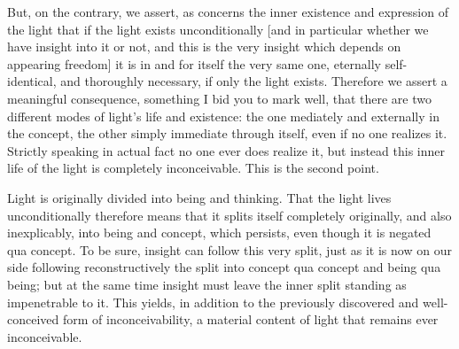 But, on the contrary, we assert,
as concerns the inner existence and
expression of the light
that if the light exists unconditionally
[and in particular whether we have insight into it or not,
and this is the very insight which depends on appearing freedom]
it is in and for itself the very same one,
eternally self-identical, and thoroughly necessary,
if only the light exists.
Therefore we assert a meaningful consequence,
something I bid you to mark well,
that there are two different modes
of light's life and existence:
the one mediately and externally in the concept,
the other simply immediate through itself,
even if no one realizes it.
Strictly speaking in actual fact
no one ever does realize it,
but instead this inner life of the light is
completely inconceivable.
This is the second point.

Light is originally divided into being and thinking.
That the light lives unconditionally therefore means
that it splits itself completely originally,
and also inexplicably, into being and concept,
which persists, even though it is negated qua concept.
To be sure, insight can follow this very split,
just as it is now on our side following reconstructively
the split into concept qua concept and being qua being;
but at the same time insight must leave the inner
split standing as impenetrable to it.
This yields, in addition to the previously
discovered and well-conceived form of inconceivability,
a material content of light that remains ever inconceivable.

